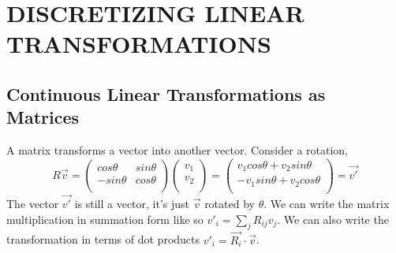 \documentclass[12pt]{article}
\begin{document}
\section{DISCRETIZING LINEAR TRANSFORMATIONS}  

\subsection{Continuous Linear Transformations as Matrices}
A matrix transforms a vector into another vector. Consider a rotation,
\begin{equation}
R\vec{v} = 
\begin{pmatrix}
cos\theta  & sin\theta \\
-sin\theta & cos\theta \\
\end{pmatrix}
\begin{pmatrix}
v_1 \\
v_2 \\
\end{pmatrix}
= 
\begin{pmatrix}
v_1cos\theta  + v_2sin\theta \\
-v_1sin\theta + v_2cos\theta \\
\end{pmatrix}
= \vec{v'}
\end{equation}
The vector $\vec{v'}$ is still a vector, it's just $\vec{v}$ rotated by $\theta$. We can write the matrix multiplication in summation form like so $v'_i = \sum_j R_{ij}v_j$. We can also write the transformation in terms of dot products $v'_i = \vec{R_i} \cdot \vec{v}$. 
\end{document}
